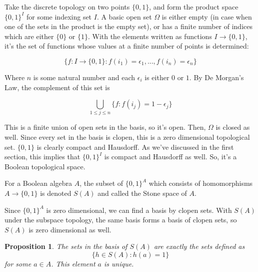 \documentclass{article}
\newtheorem*{proposition}{Proposition}
\begin{document}
        Take the discrete topology on two points $\{0,1\}$, and form the product
        space $\{0,1\}^I$ for some indexing set $I$. A basic open set $\Omega$
        is either empty (in case when one of the sets in the product is the
        empty set), or has a finite number of indices which are either $\{0\}$
        or $\{1\}$.  With the elements written as functions $I \rightarrow
        \{0,1\}$, it's the set of functions whose values at a finite number of
        points is determined:

        \[\{f: I \rightarrow \{0,1\}: f(i_1) = \epsilon_1, ..., f(i_n) =
        \epsilon_n\}\]

        Where $n$ is some natural number and each $\epsilon_i$ is either $0$ or
        $1$. By De Morgan's Law, the complement of this set is

        \[\bigcup_{1 \leq j \leq n} \{f : f(i_j) = 1 - \epsilon_j\}\]

        This is a finite union of open sets in the basis, so it's open. Then,
        $\Omega$ is closed as well. Since every set in the basis is clopen, this
        is a zero dimensional topological set. $\{0,1\}$ is clearly compact and
        Hausdorff. As we've discussed in the first section, this implies that
        $\{0,1\}^I$ is compact and Hausdorff as well. So, it's a Boolean
        topological space.


      For a Boolean algebra $A$, the subset of $\{0,1\}^A$ which consists of
      homomorphisms $A \rightarrow \{0,1\}$ is denoted $S(A)$ and called the
      Stone space of $A$.

      Since $\{0,1\}^A$ is zero dimensional, we can find a basis by
      clopen sets. With $S(A)$ under the subspace topology, the same basis forms
      a basis of clopen sets, so $S(A)$ is zero dimensional as well.

      \begin{proposition}
        The sets in the basis of $S(A)$ are exactly the sets defined
        as \[\{h\in S(A): h(a) = 1\}\] for some $a \in A$. This element $a$ is
        unique.
      \end{proposition}
\end{document}
